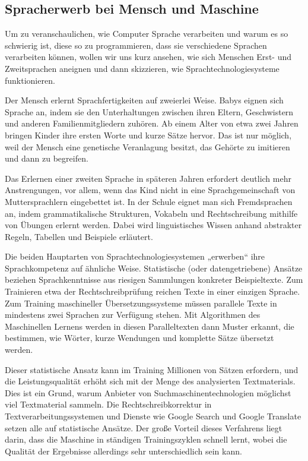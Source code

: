 \documentclass[]{../../metanetpaper}
\begin{document}
\begin{multicols}{2}
\subsection{Spracherwerb bei Mensch und Maschine}

Um zu veranschaulichen, wie Computer Sprache verarbeiten und warum es so schwierig ist, diese so zu programmieren, dass sie verschiedene Sprachen verarbeiten können, wollen wir uns kurz ansehen, wie sich Menschen Erst- und Zweitsprachen aneignen und dann skizzieren, wie Sprachtechnologiesysteme funktionieren.


Der Mensch erlernt Sprachfertigkeiten auf zweierlei Weise. Babys eignen sich Sprache an, indem sie den Unterhaltungen zwischen ihren Eltern, Geschwistern und anderen Familienmitgliedern zuhören. Ab einem Alter von etwa zwei Jahren bringen Kinder ihre ersten Worte und kurze Sätze hervor. Das ist nur möglich, weil der Mensch eine genetische Veranlagung besitzt, das Gehörte zu imitieren und dann zu begreifen. 

Das Erlernen einer zweiten Sprache in späteren Jahren erfordert deutlich mehr Anstrengungen, vor allem, wenn das Kind nicht in eine Sprachgemeinschaft von Muttersprachlern eingebettet ist. In der Schule eignet man sich Fremdsprachen an, indem grammatikalische Strukturen, Vokabeln und Rechtschreibung mithilfe von Übungen erlernt werden. Dabei wird linguistisches Wissen anhand abstrakter Regeln, Tabellen und Beispiele erläutert.

Die beiden Hauptarten von Sprachtechnologiesystemen „erwerben“ ihre Sprachkompetenz auf ähnliche Weise. Statistische (oder datengetriebene) Ansätze beziehen Sprachkenntnisse aus riesigen Sammlungen konkreter Beispieltexte. Zum Trainieren etwa der Rechtschreibprüfung reichen Texte in einer einzigen Sprache. Zum Training maschineller Übersetzungssysteme müssen parallele Texte in mindestens zwei Sprachen zur Verfügung stehen. Mit Algorithmen des Maschinellen Lernens werden in diesen Paralleltexten dann Muster erkannt, die bestimmen, wie Wörter, kurze Wendungen und komplette Sätze übersetzt werden.

Dieser statistische Ansatz kann im Training Millionen von Sätzen erfordern, und die Leistungsqualität erhöht sich mit der Menge des analysierten Textmaterials. Dies ist ein Grund, warum Anbieter von Suchmaschinentechnologien möglichst viel Textmaterial sammeln. Die Rechtschreibkorrektur in Textverarbeitungssystemen und Dienste wie Google Search und Google Translate setzen alle auf statistische Ansätze. Der große Vorteil dieses Verfahrens liegt darin, dass die Maschine in ständigen Trainingszyklen schnell lernt, wobei die Qualität der Ergebnisse allerdings sehr unterschiedlich sein kann.


\end{multicols}
\end{document}
